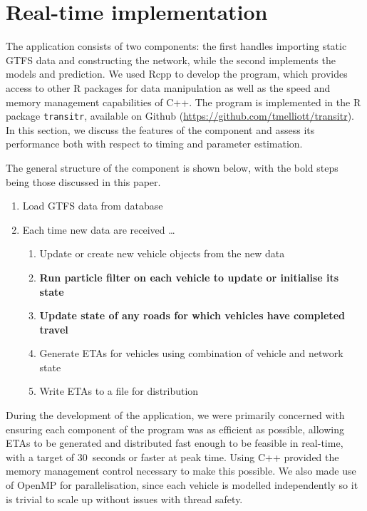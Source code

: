 \section{Real-time implementation}
\label{sec:rt}

The application consists of two components:
the first handles importing static GTFS data and constructing the network,
while the second implements the \rt models and prediction.
We used Rcpp \citep{Rcpp}
to develop the program,
which provides access to other R packages for data manipulation 
as well as the speed and memory management capabilities of C++.
The program is implemented in the R package
\verb+transitr+, available on Github (\url{https://github.com/tmelliott/transitr}).
In this section, we discuss the features of the \rt component
and assess its performance 
both with respect to timing and parameter estimation.

The general structure of the \rt component is shown below,
with the bold steps being those discussed in this paper.
\begin{enumerate}
\item Load GTFS data from database
\item Each time new data are received \ldots
\begin{enumerate}
    \item Update or create new vehicle objects from the new data
    \item \textbf{Run particle filter on each vehicle to update or initialise its state}
    \item \textbf{Update state of any roads for which vehicles 
        have completed travel}
    \item Generate ETAs for vehicles using combination of vehicle and network state
    \item Write ETAs to a file for distribution
\end{enumerate}
\end{enumerate}


During the development of the application,
we were primarily concerned with ensuring each component of the program
was as efficient as possible,
allowing ETAs to be generated and distributed fast enough to be feasible in real-time,
with a target of 30~seconds or faster at peak time.
Using C++ provided the memory management control necessary to make this possible.
We also made use of OpenMP for parallelisation,
since each vehicle is modelled independently so it is trivial to scale up without
issues with thread safety.


